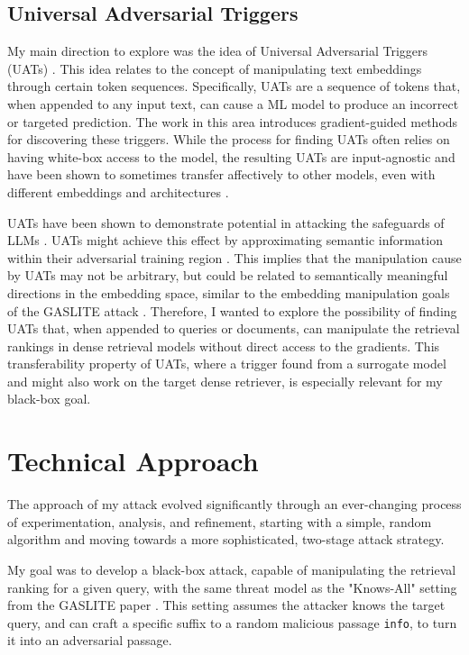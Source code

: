 \documentclass[a4paper, sigconf]{acmart}
\begin{document}
\subsection{Universal Adversarial Triggers}

My main direction to explore was the idea of Universal Adversarial Triggers (UATs) \cite{wallace2021}. This idea relates to the concept of manipulating text embeddings through certain token sequences. Specifically, UATs are a sequence of tokens that, when appended to any input text, can cause a ML model to produce an incorrect or targeted prediction. The work in this area introduces gradient-guided methods for discovering these triggers. While the process for finding UATs often relies on having white-box access to the model, the resulting UATs are input-agnostic and have been shown to sometimes transfer affectively to other models, even with different embeddings and architectures \cite{wallace2021}.

UATs have been shown to demonstrate potential in attacking the safeguards of LLMs \cite{liang2025}. UATs might achieve this effect by approximating semantic information within their adversarial training region \cite{subhash2023}. This implies that the manipulation cause by UATs may not be arbitrary, but could be related to semantically meaningful directions in the embedding space, similar to the embedding manipulation goals of the GASLITE attack \cite{bentov2024}. Therefore, I wanted to explore the possibility of finding UATs that, when appended to queries or documents, can manipulate the retrieval rankings in dense retrieval models without direct access to the gradients. This transferability property of UATs, where a trigger found from a surrogate model and might also work on the target dense retriever, is especially relevant for my black-box goal. 


\section{Technical Approach}


The approach of my attack evolved significantly through an ever-changing process of experimentation, analysis, and refinement, starting with a simple, random algorithm and moving towards a more sophisticated, two-stage attack strategy. 

My goal was to develop a black-box attack, capable of manipulating the retrieval ranking for a given query, with the same threat model as the "Knows-All" setting from the GASLITE paper \cite{bentov2024}. This setting assumes the attacker knows the target query, and can craft a specific suffix to a random malicious passage \texttt{info}, to turn it into an adversarial passage. 
\end{document}
